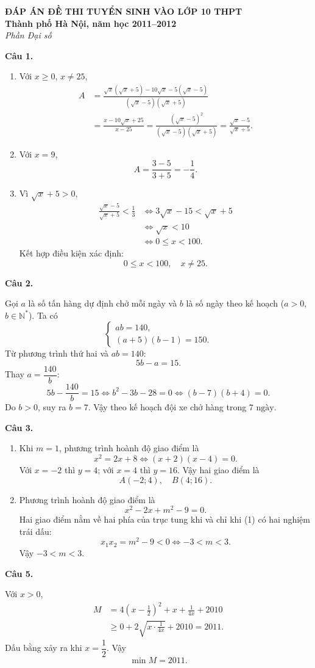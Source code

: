 \documentclass[12pt,a4paper]{article}
\begin{document}
\begin{center}
{\Large\bfseries ĐÁP ÁN ĐỀ THI TUYỂN SINH VÀO LỚP 10 THPT}\\
{\bfseries Thành phố Hà Nội, năm học 2011--2012}\\
{\itshape Phần Đại số}
\end{center}

\textbf{Câu 1.}
\begin{enumerate}[label=\alph*)]
\item Với $x\ge0$, $x\ne25$,
\begin{align*}
A&=\frac{\sqrt{x}(\sqrt{x}+5)-10\sqrt{x}-5(\sqrt{x}-5)}
{(\sqrt{x}-5)(\sqrt{x}+5)}\\
&=\frac{x-10\sqrt{x}+25}{x-25}
=\frac{(\sqrt{x}-5)^2}{(\sqrt{x}-5)(\sqrt{x}+5)}
=\frac{\sqrt{x}-5}{\sqrt{x}+5}.
\end{align*}

\item Với $x=9$,
\[
A=\frac{3-5}{3+5}=-\frac14.
\]

\item Vì $\sqrt{x}+5>0$,
\begin{align*}
\frac{\sqrt{x}-5}{\sqrt{x}+5}<\frac13
&\Longleftrightarrow 3\sqrt{x}-15<\sqrt{x}+5\\
&\Longleftrightarrow \sqrt{x}<10\\
&\Longleftrightarrow 0\le x<100.
\end{align*}
Kết hợp điều kiện xác định:
\[
\boxed{0\le x<100,\quad x\ne25}.
\]
\end{enumerate}

\textbf{Câu 2.}

Gọi $a$ là số tấn hàng dự định chở mỗi ngày và $b$ là số ngày theo kế hoạch ($a>0$, $b\in\mathbb N^*$). Ta có
\[
\begin{cases}
ab=140,\\
(a+5)(b-1)=150.
\end{cases}
\]
Từ phương trình thứ hai và $ab=140$:
\[
5b-a=15.
\]
Thay $a=\dfrac{140}{b}$:
\[
5b-\frac{140}{b}=15
\Longleftrightarrow b^2-3b-28=0
\Longleftrightarrow (b-7)(b+4)=0.
\]
Do $b>0$, suy ra $b=7$. Vậy theo kế hoạch đội xe chở hàng trong
$\boxed{7\text{ ngày}}$.

\textbf{Câu 3.}
\begin{enumerate}[label=\alph*)]
\item Khi $m=1$, phương trình hoành độ giao điểm là
\[
x^2=2x+8
\Longleftrightarrow (x+2)(x-4)=0.
\]
Với $x=-2$ thì $y=4$; với $x=4$ thì $y=16$. Vậy hai giao điểm là
\[
\boxed{A(-2;4),\quad B(4;16)}.
\]

\item Phương trình hoành độ giao điểm là
\[
x^2-2x+m^2-9=0. \tag{1}
\]
Hai giao điểm nằm về hai phía của trục tung khi và chỉ khi (1) có hai nghiệm trái dấu:
\[
x_1x_2=m^2-9<0
\Longleftrightarrow -3<m<3.
\]
Vậy $\boxed{-3<m<3}$.
\end{enumerate}

\textbf{Câu 5.}

Với $x>0$,
\begin{align*}
M
&=4\left(x-\frac12\right)^2+x+\frac1{4x}+2010\\
&\ge 0+2\sqrt{x\cdot\frac1{4x}}+2010=2011.
\end{align*}
Dấu bằng xảy ra khi $x=\dfrac12$. Vậy
\[
\boxed{\min M=2011}.
\]
\end{document}

